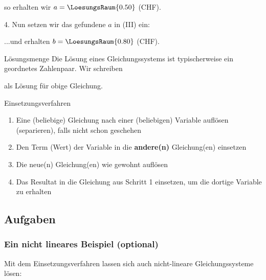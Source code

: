 so erhalten wir $a = \LoesungsRaum{0.50}$ (CHF).


4. Nun setzen wir das gefundene $a$ in (III) ein:


...und erhalten $b = \LoesungsRaum{0.80}$ (CHF).


\newpage

  \begin{gesetz}{Lösungsmenge}{}
    Die Lösung eines Gleichungssystems ist typischerweise ein
    geordnetes Zahlenpaar. Wir schreiben 


  als Lösung für obige Gleichung.
    
    \end{gesetz}


  \begin{rezept}{Einsetzungsverfahren}{}
  \begin{enumerate}

  \item Eine (beliebige) Gleichung nach einer (beliebigen) Variable
    auf\/lösen (separieren), falls nicht schon geschehen
  \item Den Term (Wert) der Variable in die \textbf{andere(n)}
    Gleichung(en) einsetzen
  \item Die neue(n) Gleichung(en) wie gewohnt auf\/lösen
  \item Das Resultat in die Gleichung aus Schritt 1 einsetzen,
    um die dortige Variable zu erhalten
  \end{enumerate}
\end{rezept}


\subsection*{Aufgaben}
\newpage
  
\subsubsection{Ein nicht lineares Beispiel (optional)}
Mit dem Einsetzungsverfahren lassen sich auch nicht-lineare
Gleichungssysteme lösen:

